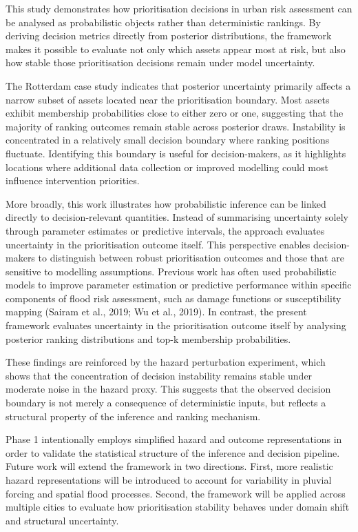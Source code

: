 \documentclass[
]{article}
\begin{document}
This study demonstrates how prioritisation decisions in urban risk
assessment can be analysed as probabilistic objects rather than
deterministic rankings. By deriving decision metrics directly from
posterior distributions, the framework makes it possible to evaluate not
only which assets appear most at risk, but also how stable those
prioritisation decisions remain under model uncertainty.

The Rotterdam case study indicates that posterior uncertainty primarily
affects a narrow subset of assets located near the prioritisation
boundary. Most assets exhibit membership probabilities close to either
zero or one, suggesting that the majority of ranking outcomes remain
stable across posterior draws. Instability is concentrated in a
relatively small decision boundary where ranking positions fluctuate.
Identifying this boundary is useful for decision-makers, as it
highlights locations where additional data collection or improved
modelling could most influence intervention priorities.

More broadly, this work illustrates how probabilistic inference can be
linked directly to decision-relevant quantities. Instead of summarising
uncertainty solely through parameter estimates or predictive intervals,
the approach evaluates uncertainty in the prioritisation outcome itself.
This perspective enables decision-makers to distinguish between robust
prioritisation outcomes and those that are sensitive to modelling
assumptions. Previous work has often used probabilistic models to
improve parameter estimation or predictive performance within specific
components of flood risk assessment, such as damage functions or
susceptibility mapping (Sairam et al., 2019; Wu et al., 2019). In
contrast, the present framework evaluates uncertainty in the
prioritisation outcome itself by analysing posterior ranking
distributions and top-k membership probabilities.

These findings are reinforced by the hazard perturbation experiment,
which shows that the concentration of decision instability remains
stable under moderate noise in the hazard proxy. This suggests that the
observed decision boundary is not merely a consequence of deterministic
inputs, but reflects a structural property of the inference and ranking
mechanism.

Phase 1 intentionally employs simplified hazard and outcome
representations in order to validate the statistical structure of the
inference and decision pipeline. Future work will extend the framework
in two directions. First, more realistic hazard representations will be
introduced to account for variability in pluvial forcing and spatial
flood processes. Second, the framework will be applied across multiple
cities to evaluate how prioritisation stability behaves under domain
shift and structural uncertainty.
\end{document}
